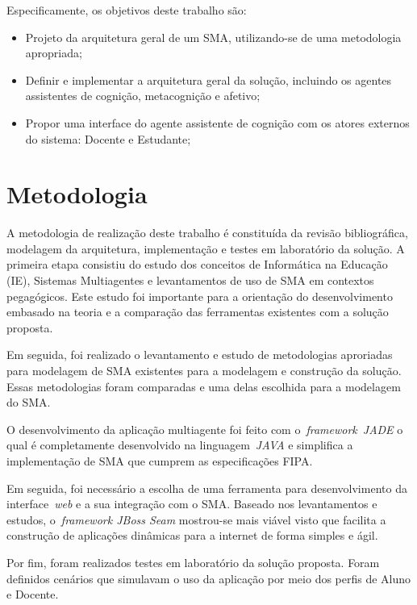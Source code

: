 Especificamente, os objetivos deste trabalho são:
\begin{itemize}
 	\item Projeto da arquitetura geral de um SMA, utilizando-se de uma metodologia apropriada;
	\item Definir e implementar a arquitetura geral da solução, incluindo os agentes assistentes de cognição, metacognição e afetivo;
	\item Propor uma interface do agente assistente de cognição com os atores externos do sistema: Docente e Estudante;
\end{itemize}

\section{Metodologia}

A metodologia de realização deste trabalho é constituída da revisão bibliográfica, modelagem da arquitetura, implementação e testes em laboratório da solução. A primeira etapa consistiu do estudo dos conceitos de Informática na Educação (IE), Sistemas Multiagentes e levantamentos de uso de SMA em contextos pegagógicos. Este estudo foi importante para a orientação do desenvolvimento embasado na teoria e a comparação das ferramentas existentes com a solução proposta.

Em seguida, foi realizado o levantamento e estudo de metodologias aproriadas para modelagem de SMA existentes para a modelagem e construção da solução. Essas metodologias foram comparadas e uma delas escolhida para a modelagem do SMA.

O desenvolvimento da aplicação multiagente foi feito com o~\emph{framework}~\emph{JADE} o qual é completamente desenvolvido na linguagem~\emph{JAVA} e simplifica a implementação de SMA que cumprem as especificações FIPA. 

Em seguida, foi necessário a escolha de uma ferramenta para desenvolvimento da interface~\emph{web} e a sua integração com o SMA. Baseado nos levantamentos e estudos, o~\emph{framework JBoss Seam} mostrou-se mais viável visto que facilita a construção de aplicações dinâmicas para a internet de forma simples e ágil.

Por fim, foram realizados testes em laboratório da solução proposta. Foram definidos cenários que simulavam o uso da aplicação por meio dos perfis de Aluno e Docente.

